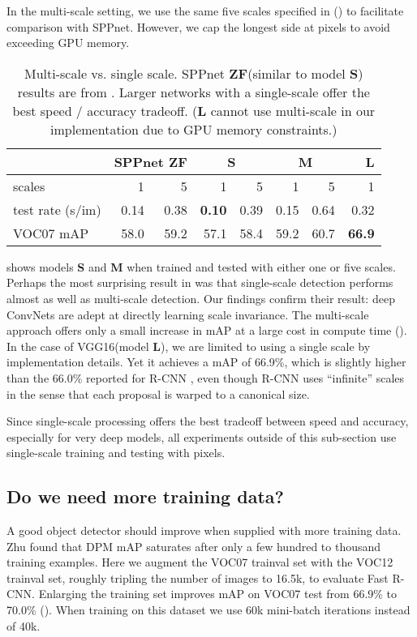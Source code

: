 \documentclass[10pt,twocolumn,letterpaper]{article}
\newcommand{\vggsixteen}{VGG16\xspace}
\newcommand{\Sm}{{\bf S}\xspace}
\newcommand{\Med}{{\bf M}\xspace}
\newcommand{\Lg}{{\bf L}\xspace}
\newcommand{\ZF}{{\bf ZF}\xspace}
\begin{document}
In the multi-scale setting, we use the same five scales specified in \cite{he2014spp} () to facilitate comparison with SPPnet.
However, we cap the longest side at  pixels to avoid exceeding GPU memory.

\begin{table}[h!]
\begin{center}
\setlength{\tabcolsep}{4.7pt}
\renewcommand{\arraystretch}{1.1}
\small
\begin{tabular}{l|rr|rr|rr|r}
 & \multicolumn{2}{c|}{SPPnet \ZF}  & \multicolumn{2}{c|}{\Sm} & \multicolumn{2}{c|}{\Med} & \Lg \\
\hline
scales & 1 & 5 & 1 & 5 & 1 & 5 & 1 \\
test rate (s/im) & 0.14 & 0.38 & \bf{0.10} & 0.39 & 0.15 & 0.64 & 0.32 \\
VOC07 mAP & 58.0 & 59.2 & 57.1 & 58.4 & 59.2 & 60.7 & \bf{66.9}
\end{tabular}
\end{center}
\caption{Multi-scale vs. single scale.
SPPnet \ZF (similar to model \Sm) results are from \cite{he2014spp}.
Larger networks with a single-scale offer the best speed / accuracy tradeoff.
(\Lg cannot use multi-scale in our implementation due to GPU memory constraints.)
}
\vspace{-0.5em}
\end{table}

 shows models \Sm and \Med when trained and tested with either one or five scales.
Perhaps the most surprising result in \cite{he2014spp} was that single-scale detection performs almost as well as multi-scale detection.
Our findings confirm their result: deep ConvNets are adept at directly learning scale invariance.
The multi-scale approach offers only a small increase in mAP at a large cost in compute time ().
In the case of \vggsixteen (model \Lg), we are limited to using a single scale by implementation details. Yet it achieves a mAP of 66.9\%, which is slightly higher than the 66.0\% reported for R-CNN \cite{rcnn-pami}, even though R-CNN uses ``infinite'' scales in the sense that each proposal is warped to a canonical size.

Since single-scale processing offers the best tradeoff between speed and accuracy, especially for very deep models, all experiments outside of this sub-section use single-scale training and testing with  pixels.

\subsection{Do we need more training data?}
A good object detector should improve when supplied with more training data.
Zhu \etal \cite{devaMoreData} found that DPM \cite{lsvm-pami} mAP saturates after only a few hundred to thousand training examples.
Here we augment the VOC07 trainval set with the VOC12 trainval set, roughly tripling the number of images to 16.5k, to evaluate Fast R-CNN.
Enlarging the training set improves mAP on VOC07 test from 66.9\% to 70.0\% ().
When training on this dataset we use 60k mini-batch iterations instead of 40k.
\end{document}
